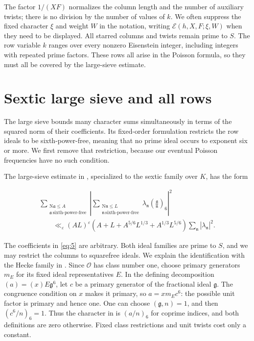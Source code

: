 \documentclass[reqno,a4paper,11pt]{amsart}
\begin{document}
The factor $1/(XF)$ normalizes the column length and the number of auxiliary twists; there is no division by the number of values of $k$. We often suppress the fixed character $\xi$ and weight $W$ in the notation, writing $\mathcal{E}(h,X,F;\xi,W)$ when they need to be displayed. All starred columns and twists remain prime to $S$. The row variable $k$ ranges over every nonzero Eisenstein integer, including integers with repeated prime factors. These rows all arise in the Poisson formula, so they must all be covered by the large-sieve estimate.

\section{Sextic large sieve and all rows}

The large sieve bounds many character sums simultaneously in terms of the squared norm of their coefficients. Its fixed-order formulation restricts the row ideals to be sixth-power-free, meaning that no prime ideal occurs to exponent six or more. We first remove that restriction, because our eventual Poisson frequencies have no such condition.

The large-sieve estimate in \cite[Theorem 1.1]{defaveri}, specialized to the sextic family over $K$, has the form

\begin{equation}\label{eq:5}
\begin{gathered} \sum _{\begin{gathered} \mathrm{N}\mathfrak{a}\le A \\ \mathfrak{a}\,\text{sixth-power-free} \end{gathered}} {\left| \sum _{\begin{gathered} \mathrm{N}\mathfrak{n}\le L \\ \mathfrak{n}\,\text{sixth-power-free} \end{gathered}} {\lambda }_{\mathfrak{n}}{\left( \frac{\mathfrak{a}}{\mathfrak{n}}\right) }_{6}\right| }^{2} \\ \quad \quad {\ll }_{\varepsilon }{\left( AL\right) }^{\varepsilon }\left( A+L+{A}^{5/6}{L}^{1/3}+{A}^{1/3}{L}^{5/6}\right) \sum _{\mathfrak{n}} {\left| {\lambda }_{\mathfrak{n}}\right| }^{2}. \end{gathered}
\end{equation}

The coefficients in \eqref{eq:5} are arbitrary. Both ideal families are prime to $S$, and we may restrict the columns to squarefree ideals. We explain the identification with the Hecke family in \cite[Section 2.3]{defaveri}. Since $\mathcal{O}$ has class number one, choose primary generators $m_E$ for its fixed ideal representatives $E$. In the defining decomposition $(a)=(x)E\mathfrak{g}^6$, let $c$ be a primary generator of the fractional ideal $\mathfrak{g}$. The congruence condition on $x$ makes it primary, so $a=xm_Ec^6$: the possible unit factor is primary and hence one. One can choose $(\mathfrak{g},n)=1$, and then $(c^6/n)_6=1$. Thus the character in \cite{defaveri} is $(a/n)_6$ for coprime indices, and both definitions are zero otherwise. Fixed class restrictions and unit twists cost only a constant.
\end{document}

